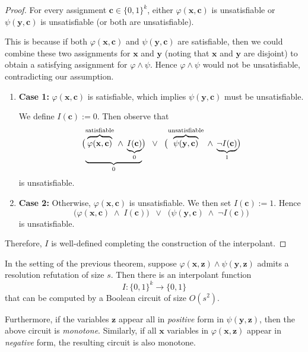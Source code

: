 \begin{proof}
For every assignment \(\mathbf{c} \in \{0,1\}^k\), either \(\varphi(\mathbf{x}, \mathbf{c})\) is unsatisfiable or \(\psi(\mathbf{y}, \mathbf{c})\) is unsatisfiable (or both are unsatisfiable). 

 
 
This is because if both \(\varphi(\mathbf{x},\mathbf{c})\) and \(\psi(\mathbf{y},\mathbf{c})\) are satisfiable, then we could combine these two assignments for \(\mathbf{x}\) and \(\mathbf{y}\) (noting that \(\mathbf{x}\) and \(\mathbf{y}\) are disjoint) to obtain a satisfying assignment for \(\varphi \wedge \psi\). Hence \(\varphi \wedge \psi\) would not be unsatisfiable, contradicting our assumption.

\begin{enumerate}[label=\textbf{(\alph*)}]
    \item \textbf{Case 1:} \(\varphi(\mathbf{x},\mathbf{c})\) is satisfiable, which implies \(\psi(\mathbf{y},\mathbf{c})\) must be unsatisfiable. 

    We define \( I(\mathbf{c}) := 0\). Then observe that
    \[
      \bigl(\underbrace{\overbrace{\varphi(\mathbf{x},\mathbf{c})}^{\rm satisfiable} \;\land\; \underbrace{I(\mathbf{c})}_{0}}_0\bigr)
      \;\;\lor\;\;
      \bigl(\overbrace{\psi(\mathbf{y},\mathbf{c}) }^{\rm unsatisfiable}\;\land\;\underbrace{\neg I(\mathbf{c})}_1\bigr)
    \]
    is unsatisfiable. 

    \item \textbf{Case 2:} Otherwise, \(\varphi(\mathbf{x},\mathbf{c})\) is unsatisfiable. We then set \(I(\mathbf{c}) := 1\). Hence
    \[
      \bigl(\varphi(\mathbf{x},\mathbf{c}) \;\land\; I(\mathbf{c})\bigr)
      \;\;\lor\;\;
      \bigl(\psi(\mathbf{y},\mathbf{c}) \;\land\;\neg I(\mathbf{c})\bigr)
    \]
    is unsatisfiable.

\end{enumerate}

\noindent
Therefore, \(I\) is well-defined completing the construction of the interpolant.
\end{proof}


\begin{theorem}
\label{thm:interpolation-circuit}
In the setting of the previous theorem, suppose 
\(\varphi(\mathbf{x},\mathbf{z}) \wedge \psi(\mathbf{y},\mathbf{z})\) 
admits a resolution refutation of size \(s\). Then there is an interpolant function 
\[
I \colon \{0,1\}^k \to \{0,1\}
\]
that can be computed by a Boolean circuit of size \(O(s^2)\).

Furthermore, if the variables \(\mathbf{z}\) appear all in \emph{positive} form in 
\(\psi(\mathbf{y},\mathbf{z})\), then the above circuit is \emph{monotone}. 
Similarly, if all \(\mathbf{x}\) variables in \(\varphi(\mathbf{x},\mathbf{z})\) 
appear in \emph{negative} form, the resulting circuit is also monotone.
\end{theorem}

